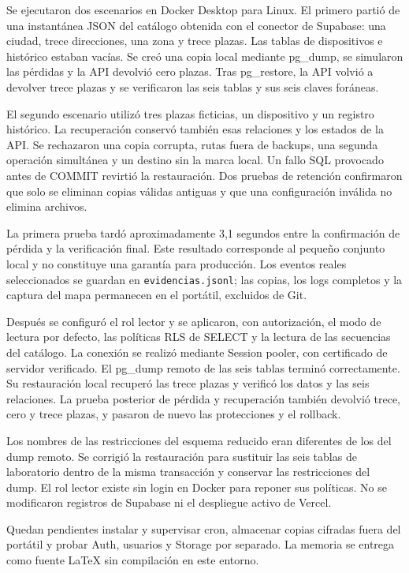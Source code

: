 Se ejecutaron dos escenarios en Docker Desktop para Linux. El primero partió de una instantánea JSON del catálogo obtenida con el conector de Supabase: una ciudad, trece direcciones, una zona y trece plazas. Las tablas de dispositivos e histórico estaban vacías. Se creó una copia local mediante pg\_dump, se simularon las pérdidas y la API devolvió cero plazas. Tras pg\_restore, la API volvió a devolver trece plazas y se verificaron las seis tablas y sus seis claves foráneas.

El segundo escenario utilizó tres plazas ficticias, un dispositivo y un registro histórico. La recuperación conservó también esas relaciones y los estados de la API. Se rechazaron una copia corrupta, rutas fuera de backups, una segunda operación simultánea y un destino sin la marca local. Un fallo SQL provocado antes de COMMIT revirtió la restauración. Dos pruebas de retención confirmaron que solo se eliminan copias válidas antiguas y que una configuración inválida no elimina archivos.

La primera prueba tardó aproximadamente 3,1 segundos entre la confirmación de pérdida y la verificación final. Este resultado corresponde al pequeño conjunto local y no constituye una garantía para producción. Los eventos reales seleccionados se guardan en \texttt{evidencias.jsonl}; las copias, los logs completos y la captura del mapa permanecen en el portátil, excluidos de Git.

Después se configuró el rol lector y se aplicaron, con autorización, el modo de lectura por defecto, las políticas RLS de SELECT y la lectura de las secuencias del catálogo. La conexión se realizó mediante Session pooler, con certificado de servidor verificado. El pg\_dump remoto de las seis tablas terminó correctamente. Su restauración local recuperó las trece plazas y verificó los datos y las seis relaciones. La prueba posterior de pérdida y recuperación también devolvió trece, cero y trece plazas, y pasaron de nuevo las protecciones y el rollback.

Los nombres de las restricciones del esquema reducido eran diferentes de los del dump remoto. Se corrigió la restauración para sustituir las seis tablas de laboratorio dentro de la misma transacción y conservar las restricciones del dump. El rol lector existe sin login en Docker para reponer sus políticas. No se modificaron registros de Supabase ni el despliegue activo de Vercel.

Quedan pendientes instalar y supervisar cron, almacenar copias cifradas fuera del portátil y probar Auth, usuarios y Storage por separado. La memoria se entrega como fuente LaTeX sin compilación en este entorno.

